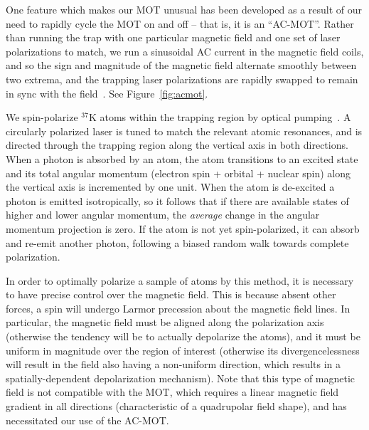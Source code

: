 One feature which makes our MOT unusual has been developed as a result of our need to rapidly cycle the MOT on and off -- that is, it is an ``AC-MOT''.  Rather than running the trap with one particular magnetic field and one set of laser polarizations to match, we run a sinusoidal AC current in the magnetic field coils, and so the sign and magnitude of the magnetic field alternate smoothly between two extrema, and the trapping laser polarizations are rapidly swapped to remain in sync with the field~\cite{harveymurray}\cite{thesis}.  See Figure~\ref{fig:acmot}.  



We spin-polarize $^{37}\textrm{K}$ atoms within the trapping region by optical pumping~\cite{ben_OP}.  A circularly polarized laser is tuned to match the relevant atomic resonances, and is directed through the trapping region along the vertical axis in both directions.  When a photon is absorbed by an atom, the atom transitions to an excited state and its total angular momentum (electron spin + orbital + nuclear spin) along the vertical axis is incremented by one unit.  When the atom is de-excited a photon is emitted isotropically, 
so it follows that if there are available states of higher and lower angular momentum, the \emph{average} change in the angular momentum projection is zero.  If the atom is not yet spin-polarized, it can absorb and re-emit another photon, following a biased random walk towards complete polarization.  


In order to optimally polarize a sample of atoms by this method, it is necessary to have precise control over the magnetic field.  This is because absent other forces, a spin will undergo Larmor precession about the magnetic field lines.  In particular, the magnetic field must be aligned along the polarization axis (otherwise the tendency will be to actually depolarize the atoms), and it must be uniform in magnitude over the region of interest (otherwise its divergencelessness will result in the field also having a non-uniform direction, which results in a spatially-dependent depolarization mechanism).  Note that this type of magnetic field is not compatible with the MOT, which requires a linear magnetic field gradient in all directions (characteristic of a quadrupolar field shape), and has necessitated our use of the AC-MOT.



